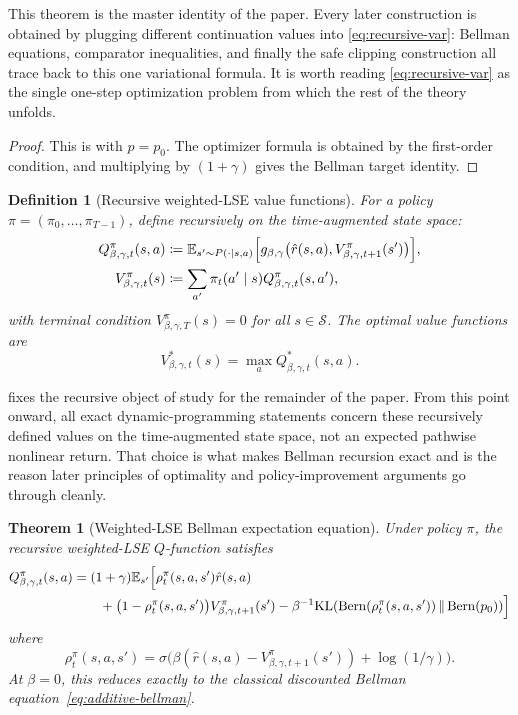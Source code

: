 \documentclass{article}
\newtheorem{theorem}{Theorem}[section]
\newtheorem{definition}[definition]{Definition}
\theoremstyle{remark}
\DeclareMathOperator{\Bern}{Bern}
\newcommand{\E}{\mathbb{E}}
\newcommand{\KL}{\mathrm{KL}}
\newcommand{\defeq}{\coloneqq}
\newcommand{\cS}{\mathcal{S}}
\newcommand{\gbg}{g_{\beta,\gamma}}
\newcommand{\pprior}{p_0}
\newcommand{\KLbin}[2]{\KL\!\left(\Bern(#1)\,\middle\|\,\Bern(#2)\right)}
\begin{document}
This theorem is the master identity of the paper.
Every later construction is obtained by plugging different continuation values into \eqref{eq:recursive-var}: Bellman equations, comparator inequalities, and finally the safe clipping construction all trace back to this one variational formula.
It is worth reading \eqref{eq:recursive-var} as the single one-step optimization problem from which the rest of the theory unfolds.

\begin{proof}
This is  with $p=\pprior$.
The optimizer formula is obtained by the first-order condition, and multiplying by $(1+\gamma)$ gives the Bellman target identity.
\end{proof}

\begin{definition}[Recursive weighted-LSE value functions]
\label{def:lse-value}
For a policy $\pi=(\pi_0,\dots,\pi_{T-1})$, define recursively on the time-augmented state space:
\begin{align}
Q_{\beta,\gamma,t}^\pi(s,a)
&\defeq
\E_{s'\sim P(\cdot\mid s,a)}\Bigl[\gbg\bigl(\hat r(s,a),V_{\beta,\gamma,t+1}^\pi(s')\bigr)\Bigr],
\label{eq:lse-q-pi}\\
V_{\beta,\gamma,t}^\pi(s)
&\defeq \sum_{a'}\pi_t(a'\mid s)Q_{\beta,\gamma,t}^\pi(s,a'),
\label{eq:lse-v-pi}
\end{align}
with terminal condition $V_{\beta,\gamma,T}^\pi(s)=0$ for all $s\in\cS$.
The optimal value functions are
\[
V^*_{\beta,\gamma,t}(s)=\max_a Q^*_{\beta,\gamma,t}(s,a).
\]
\end{definition}

 fixes the recursive object of study for the remainder of the paper.
From this point onward, all exact dynamic-programming statements concern these recursively defined values on the time-augmented state space, not an expected pathwise nonlinear return.
That choice is what makes Bellman recursion exact and is the reason later principles of optimality and policy-improvement arguments go through cleanly.

\begin{theorem}[Weighted-LSE Bellman expectation equation]
\label{thm:lse-bellman-expectation}
Under policy $\pi$, the recursive weighted-LSE $Q$-function satisfies
\begin{equation}
\begin{aligned}
Q_{\beta,\gamma,t}^\pi(s,a)
&=
(1+\gamma)
\E_{s'}\Bigl[
\rho_{t}^{\pi}(s,a,s')\hat r(s,a) \\
&\qquad+\bigl(1-\rho_{t}^{\pi}(s,a,s')\bigr)V_{\beta,\gamma,t+1}^\pi(s')
- \beta^{-1}\KLbin{\rho_t^{\pi}(s,a,s')}{\pprior}
\Bigr]
\end{aligned}
\label{eq:lse-bellman-exp}
\end{equation}
where
\[
\rho_t^{\pi}(s,a,s') = \sigma\!\bigl(\beta(\hat r(s,a)-V_{\beta,\gamma,t+1}^\pi(s'))+\log(1/\gamma)\bigr).
\]
At $\beta=0$, this reduces exactly to the classical discounted Bellman equation~\eqref{eq:additive-bellman}.
\end{theorem}
\end{document}
